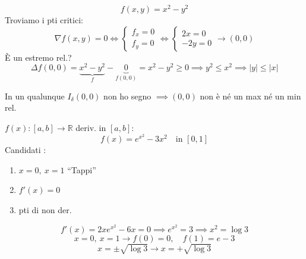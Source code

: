 \begin{example*}[Controesempio]
\[
f(x, y) = x^2 - y^2
\]
Troviamo i pti critici:
\[
\nabla f(x, y) = 0 \iff \begin{cases} f_x = 0 \\ f_y = 0 \end{cases} \iff \begin{cases} 2x = 0 \\ -2y = 0 \end{cases} \to (0, 0)
\]
È un estremo rel.?
\[
\Delta f(0, 0) = \underbrace{x^2 - y^2}_{f} - \underbrace{0}_{f(0, 0)} = x^2 - y^2 \ge 0 \implies y^2 \le x^2 \implies |y| \le |x|
\]
\begin{center}
\end{center}
In un qualunque $I_\delta(0, 0)$ non ho segno $\implies (0, 0)$ non è né un max né un min rel.

\end{example*}

\begin{esercizio}
$f(x) : [a, b] \to \mathbb{R}$ deriv. in $[a, b]$:
\[
f(x) = e^{x^2} - 3x^2 \quad \text{in } [0, 1]
\]
Candidati :
\begin{enumerate}
    \item $x = 0, \ x = 1$ \quad ``Tappi''
    \item $f'(x) = 0$
    \item pti di non der.
\end{enumerate}
\[
f'(x) = 2x e^{x^2} - 6x = 0 \implies e^{x^2} = 3 \implies x^2 = \log 3
\]
\[
x = 0, \ x = 1 \to f(0) = 0, \quad f(1) = e - 3
\]
\[
x = \pm\sqrt{\log 3} \to x = +\sqrt{\log 3}
\]
\end{esercizio}

